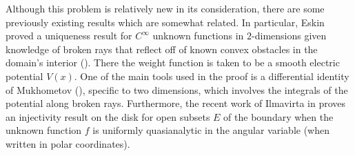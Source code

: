 \documentclass[10pt]{amsart}
\theoremstyle{definition}
\theoremstyle{definition}
\theoremstyle{definition}
\begin{document}
Although this problem is relatively new in its consideration, there are some previously existing results which are somewhat related. In particular, Eskin proved a uniqueness result for $C^{\infty}$ unknown functions in $2$-dimensions given knowledge of broken rays that reflect off of known convex obstacles in the domain's interior (\cite{eskin}). There the weight function is taken to be a smooth electric potential $V(x)$. One of the main tools used in the proof is a differential identity of Mukhometov (\cite{mukhometov}), specific to two dimensions, which involves the integrals of the potential along broken rays. Furthermore, the recent work of Ilmavirta in \cite{joonas} proves an injectivity result on the disk for open subsets $E$ of the boundary when the unknown function $f$ is uniformly quasianalytic in the angular variable (when written in polar coordinates). 
\end{document}
